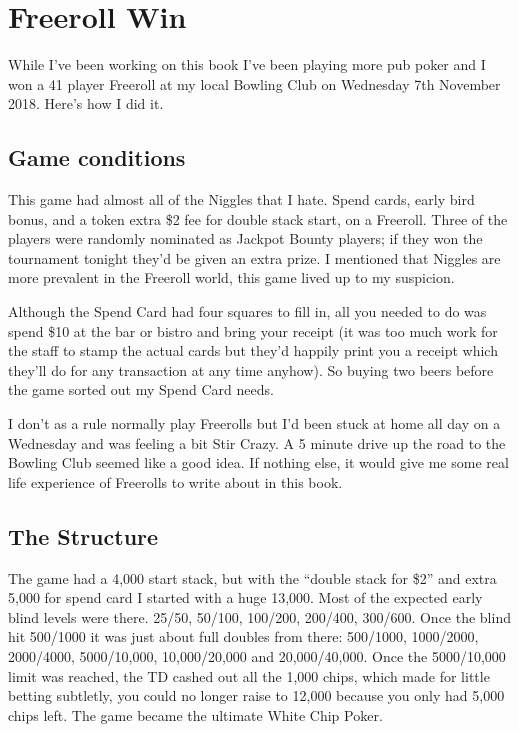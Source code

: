 \chapter{Freeroll Win}


While I've been working on this book I've been playing more
pub poker and I won a 41 player Freeroll at my local
Bowling Club on Wednesday 7th November 2018. Here's how I
did it.

\section{Game conditions}

This game had almost all of the Niggles that I hate.
Spend cards, early bird bonus, and a token extra \$2 fee
for double stack start, on a Freeroll. Three of the players
were randomly nominated as Jackpot Bounty players; if they won the
tournament tonight they'd be given an extra prize.
I mentioned that Niggles are more prevalent in the Freeroll world, this
game lived up to my suspicion.

Although the Spend Card had four squares to fill in, all you
needed to do was spend \$10 at the bar or bistro and bring your
receipt (it was too much work for the staff to stamp the actual
cards but they'd happily print you a receipt which they'll do
for any transaction at any time anyhow). So buying two beers
before the game sorted out my Spend Card needs.

I don't as a rule normally play Freerolls but I'd been stuck
at home all day on a Wednesday and was feeling a bit Stir Crazy.
A 5 minute drive up the road to the Bowling Club seemed like
a good idea. If nothing else, it would give me some real life
experience of Freerolls to write about in this book.

\section{The Structure}

The game had a 4,000 start stack, but with the ``double stack for \$2''
and extra 5,000 for spend card I started with a huge 13,000. Most of
the expected early blind levels were there. 25/50, 50/100, 100/200, 200/400,
300/600. Once the blind hit 500/1000 it was just about full doubles
from there: 500/1000, 1000/2000, 2000/4000, 5000/10,000, 10,000/20,000
and 20,000/40,000. Once the 5000/10,000 limit was reached, the TD cashed out
all the 1,000 chips, which made for little betting subtletly, you could
no longer raise to 12,000 because you only had 5,000 chips left. The game
became the ultimate White Chip Poker.

